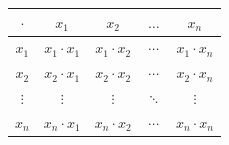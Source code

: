 \documentclass{mcom-l}
\begin{document}
    \begin{center}
        \begin{tabular}{c|c c c c}
             $\cdot$ & $x_1$ & $x_2$ & $\hdots$ & $x_n$ \\
             \hline
               $x_1$ & $x_1\cdot x_1$ & $x_1\cdot x_2$ & $\cdots$ & $x_1\cdot x_n$ \\
               $x_2$ & $x_2\cdot x_1$ & $x_2\cdot x_2$ & $\cdots$ & $x_2\cdot x_n$ \\
               $\vdots$ & $\vdots$ & $\vdots$ & $\ddots$ & $\vdots$ \\
               $x_n$ & $x_n\cdot x_1$ & $x_n\cdot x_2$ & $\cdots$ & $x_n\cdot x_n$ \\
             
        \end{tabular}
    \end{center}
\end{document}
